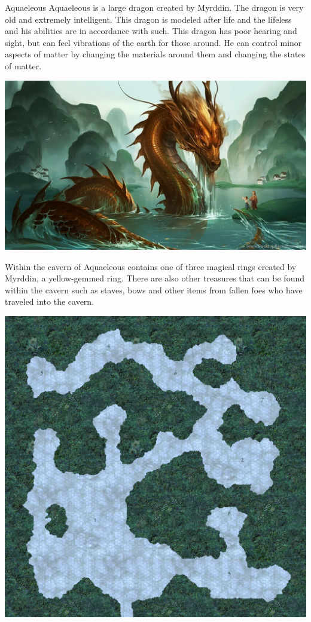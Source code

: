 \begin{commentbox}{Aquaeleous}
	Aquaeleous is a large dragon created by Myrddin. The dragon is very old and extremely intelligent. This dragon is modeled after life and the lifeless and his abilities are in accordance with such. This dragon has poor hearing and sight, but can feel vibrations of the earth for those around. He can control minor aspects of matter by changing the materials around them and changing the states of matter.
	
	\begin{center}
	\includegraphics[width=0.7\linewidth]{img/waterdragon.jpg}
	\end{center}
	
	Within the cavern of Aquaeleous contains one of three magical rings created by Myrddin, a yellow-gemmed ring. There are also other treasures that can be found within the cavern such as staves, bows and other items from fallen foes who have traveled into the cavern. 
	
	\begin{center}
	\includegraphics[width=0.7\linewidth]{img/maps/aquaeleous.jpg}
	\end{center}
\end{commentbox}



